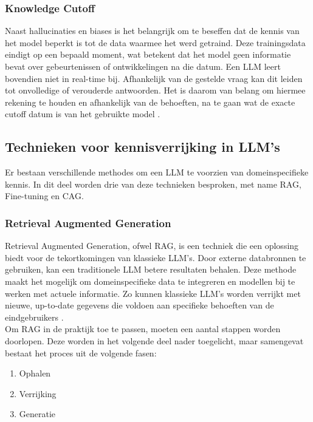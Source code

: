 \subsubsection{Knowledge Cutoff}
Naast hallucinaties en biases is het belangrijk om te beseffen dat de kennis van het model beperkt is tot de data waarmee het werd getraind. Deze trainingsdata eindigt op een bepaald moment, wat betekent dat het model geen informatie bevat over gebeurtenissen of ontwikkelingen na die datum. Een LLM leert bovendien niet in real-time bij. Afhankelijk van de gestelde vraag kan dit leiden tot onvolledige of verouderde antwoorden. Het is daarom van belang om hiermee rekening te houden en afhankelijk van de behoeften, na te gaan wat de exacte cutoff datum is van het gebruikte model \autocite{Hadi2023}.
 
\subsection{Technieken voor kennisverrijking in LLM’s}

Er bestaan verschillende methodes om een LLM te voorzien van domeinspecifieke kennis. In dit deel worden drie van deze technieken besproken, met name RAG, Fine-tuning en CAG. 
 
\subsubsection{Retrieval Augmented Generation}

Retrieval Augmented Generation, ofwel RAG, is een techniek die een oplossing biedt voor de tekortkomingen van klassieke LLM’s. Door externe databronnen te gebruiken, kan een traditionele LLM betere resultaten behalen. Deze methode maakt het mogelijk om domeinspecifieke data te integreren en modellen bij te werken met actuele informatie. Zo kunnen klassieke LLM’s worden verrijkt met nieuwe, up-to-date gegevens die voldoen aan specifieke behoeften van de eindgebruikers \autocite{wu2025retrievalaugmentedgenerationnaturallanguage}.
\\[1em]
Om RAG in de praktijk toe te passen, moeten een aantal stappen worden doorlopen. Deze worden in het volgende deel nader toegelicht, maar samengevat bestaat het proces uit de volgende fasen:

\begin{enumerate}
    \item {Ophalen}
    \item {Verrijking}
    \item {Generatie}
\end{enumerate} 

